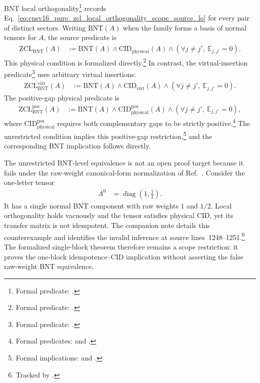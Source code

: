 \documentclass{article}
\begin{document}
BNT local orthogonality\footnote{Formal predicate:
.} records
Eq.~\ref{eq:cpsv16_pure_zcl_local_orthogonality_scope_source_lo} for every pair
of distinct sectors. Writing $\mathrm{BNT}(A)$ when the family forms a basis of
normal tensors for $A$, the source predicate is
\begin{align}
    \mathrm{ZCL}_{\mathrm{BNT}}(A)
        &:=
        \mathrm{BNT}(A)
        \wedge \mathrm{CID}_{\mathrm{physical}}(A)
        \wedge
        (\forall j\ne j',\ \mathbb E_{j,j'}=0).
    \label{eq:cpsv16_pure_zcl_local_orthogonality_scope_physical_bnt_zcl}
\end{align}
This physical condition is formalized directly.\footnote{Formal predicate:
.} In contrast, the virtual-insertion
predicate\footnote{Formal predicate: .} uses
arbitrary virtual insertions:
\begin{align}
    \mathrm{ZCL}^{\mathrm{virt}}_{\mathrm{BNT}}(A)
        &:=
        \mathrm{BNT}(A)
        \wedge \mathrm{CID}_{\mathrm{virt}}(A)
        \wedge
        (\forall j\ne j',\ \mathbb E_{j,j'}=0).
    \label{eq:cpsv16_pure_zcl_local_orthogonality_scope_virtual_bnt_zcl}
\end{align}
The positive-gap physical predicate is
\begin{align}
    \mathrm{ZCL}^{\mathrm{pos}}_{\mathrm{BNT}}(A)
        &:=
        \mathrm{BNT}(A)
        \wedge \mathrm{CID}^{\mathrm{pos}}_{\mathrm{physical}}(A)
        \wedge
        (\forall j\ne j',\ \mathbb E_{j,j'}=0),
    \label{eq:cpsv16_pure_zcl_local_orthogonality_scope_positive_gap_bnt_zcl}
\end{align}
where $\mathrm{CID}^{\mathrm{pos}}_{\mathrm{physical}}$ requires both
complementary gaps to be strictly positive.\footnote{Formal predicates:
 and
.}
The unrestricted condition implies this positive-gap restriction,\footnote{Formal
implications:  and
.} and the
corresponding BNT implication follows directly.

The unrestricted BNT-level equivalence is not an open proof target because it
fails under the raw-weight canonical-form normalization of
Ref.~\cite{Cirac2016MPDO_arXiv}. Consider the one-letter tensor
\begin{align}
    A^0
        &= \operatorname{diag}\left(1,\frac12\right).
    \label{eq:cpsv16_pure_zcl_local_orthogonality_scope_raw_weight_tensor}
\end{align}
It has a single normal BNT component with raw weights $1$ and $1/2$. Local
orthogonality holds vacuously and the tensor satisfies physical CID, yet its
transfer matrix is not idempotent. The companion note
 details
this counterexample and identifies the invalid inference at source
lines~1248--1251.\footnote{Tracked by .}
The formalized single-block theorem therefore remains a scope restriction: it
proves the one-block idempotence--CID implication without asserting the false
raw-weight BNT equivalence.
\end{document}
